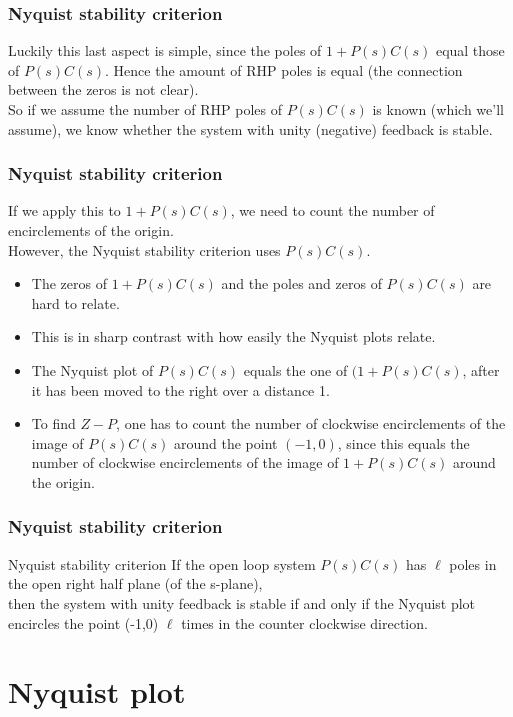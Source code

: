 \begin{frame}
	\frametitle{Nyquist stability criterion}
	\vspace{-10ex}
	Luckily this last aspect is simple, since the poles of $1+P(s)C(s)$ equal those of $P(s)C(s)$. Hence the amount of RHP poles is equal (the connection between the zeros is not clear).\\
	\bigskip
	So if we assume the number of RHP poles of $P(s)C(s)$ is known (which we'll assume), we know whether the system with unity (negative) feedback is stable.
\end{frame}

\begin{frame}
	\frametitle{Nyquist stability criterion}
	If we apply this to $1+P(s)C(s)$, we need to count the number of encirclements of the origin.\\
	However, the Nyquist stability criterion uses $P(s)C(s)$.
	\begin{itemize}
		\item The zeros of $1+P(s)C(s)$ and the poles and zeros of $P(s)C(s)$ are hard to relate.
		\item This is in sharp contrast with how easily the Nyquist plots relate.
		\item The Nyquist plot of $P(s)C(s)$ equals the one of $(1+P(s)C(s)$, after it has been moved to the right over a distance 1.
		\item To find $Z-P$, one has to count the number of clockwise encirclements of the image of $P(s)C(s)$ around the point $(-1,0)$, since this equals the number of clockwise encirclements of the image of $1+P(s)C(s)$ around the origin.
	\end{itemize}
\end{frame}

\begin{frame}
	\frametitle{Nyquist stability criterion}
	\begin{block}{Nyquist stability criterion}
		If the open loop system $P(s)C(s)$ has $\ell$ poles in the open right half plane (of the s-plane),\\
		then the system with unity feedback is stable if and only if the Nyquist plot encircles the point (-1,0) $\ell$ times in the counter clockwise direction.
	\end{block}
\end{frame}

\section{Nyquist plot}

